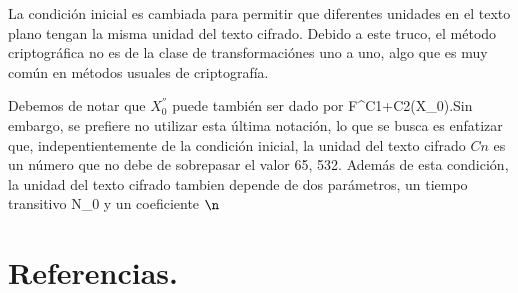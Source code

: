 \documentclass[10pt]{IEEEtran}
\begin{document}
La condición inicial es cambiada para permitir que diferentes unidades en el texto plano tengan la misma unidad del texto cifrado. Debido a este truco, el método criptográfica no es de la clase de transformaciónes uno a uno, algo que es muy común en métodos usuales de criptografía.

Debemos de notar que $X_{0}^{''}$ puede también ser dado por F^{C1+C2}(X_{0}).Sin embargo, se prefiere no utilizar esta última notación, lo que se busca es enfatizar que, indepentientemente de la condición inicial, la unidad del texto cifrado $Cn$ es un número que no debe de sobrepasar el valor 65, 532. Además de esta condición, la unidad del texto cifrado tambien depende de dos parámetros, un tiempo transitivo N_{0} y un coeficiente $\n$


\section{Referencias.}


%

%
\end{document}
